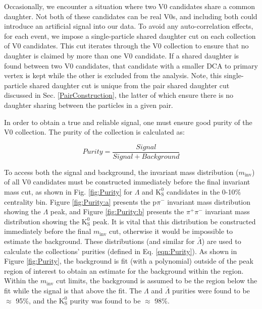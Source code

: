 \documentclass[ALICE,manyauthors]{cernphprep}
\newcommand{\minv}{$m_{\mathrm{inv}}$\xspace}
\newcommand{\Lam}{$\Lambda$\xspace}
\newcommand{\ALam}{$\bar{\Lambda}$\xspace}
\newcommand{\Ks}{$\mathrm{K^{0}_{S}}$\xspace}
\begin{document}
Occasionally, we encounter a situation where two V0 candidates share a common daughter.
Not both of these candidates can be real V0s, and including both could introduce an artificial signal into our data.
To avoid any auto-correlation effects, for each event, we impose a single-particle shared daughter cut on each collection of V0 candidates.
This cut iterates through the V0 collection to ensure that no daughter is claimed by more than one V0 candidate.
If a shared daughter is found between two V0 candidates, that candidate with a smaller DCA to primary vertex is kept while the other is excluded from the analysis.
Note, this single-particle shared daughter cut is unique from the pair shared daughter cut discussed in Sec. \ref{PairConstruction}, the latter of which ensure there is no daughter sharing between the particles in a given pair.

In order to obtain a true and reliable signal, one must ensure good purity of the V0 collection.  The purity of the collection is calculated as:

\begin{equation}
 Purity = \frac{Signal}{Signal + Background}
\label{eqn:Purity}
\end{equation}

To access both the signal and background, the invariant mass distribution (\minv) of all V0 candidates must be constructed immediately before the final invariant mass cut, as shown in Fig. \ref{fig:Purity} for \Lam and \Ks candidates in the 0-10\% centrality bin.
Figure \ref{fig:Purity:a} presents the p$\pi^{-}$ invariant mass distribution showing the \Lam peak, and Figure \ref{fig:Purity:b} presents the $\pi^{+}\pi^{-}$ invariant mass distribution showing the \Ks peak.
It is vital that this distribution be constructed immediately before the final \minv cut, otherwise it would be impossible to estimate the background.
These distributions (and similar for \ALam) are used to calculate the collections' purities (defined in Eq. \ref{eqn:Purity}).
As shown in Figure \ref{fig:Purity}, the background is fit (with a polynomial) outside of the peak region of interest to obtain an estimate for the background within the region.
Within the \minv cut limits, the background is assumed to be the region below the fit while the signal is that above the fit.
The \Lam and \ALam purities were found to be $\approx$ 95\%, and the \Ks purity was found to be $\approx$ 98\%.
\end{document}

